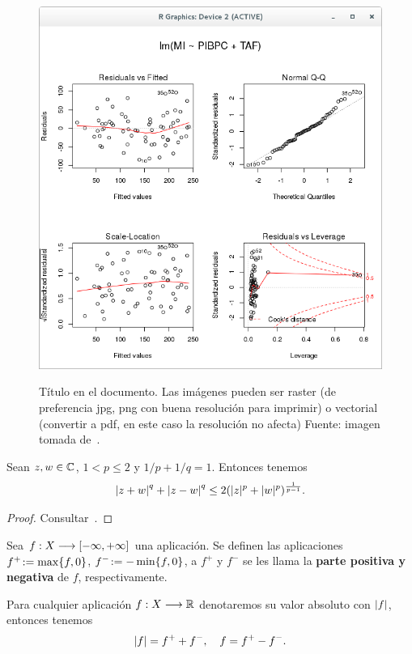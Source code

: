 \begin{figure}[ht]
\centering
\label{fig:analisisGraficoModelo3}
\includegraphics[width=0.9\linewidth]{analisisGraficoModelo3}\\
\caption[Titulo en el índice de figuras (opcional)]{Título en el 
documento. Las imágenes pueden ser raster (de preferencia jpg, png 
con buena resolución para imprimir) o vectorial (convertir a pdf, en 
este caso la resolución no afecta) Fuente: imagen tomada de~\cite{liu}.}
\end{figure}


\begin{lem}\label{lmcp11}Sean $z,w \in \mathbb{C}$, $1 < p \leq 2$ y $1/p +
1/q = 1$. Entonces tenemos \[\left\vert z+w\right\vert^q + \left\vert z-w\right\vert^q \leq 2 (|z|^p
+ |w|^p)^{\frac{1}{p-1}}.\]
\end{lem}

\begin{proof} Consultar~\cite[p. 227]{Hewit}. \end{proof}

\begin{defn}\label{dfcp5}Sea $f:X\longrightarrow [-\infty,+\infty]$ una aplicación. Se definen
las aplicaciones $f^+\!:=\max\{f,0\}$, $f^-\!:=-\min\{f,0\}$, a
$f^+$ y $f^-$ se les llama la \textbf{parte positiva y negativa} de
$f$, respectivamente.
\end{defn}


\begin{prp}\label{prcp2}Para cualquier aplicación $f:X\longrightarrow \mathbb{R}$
denotaremos su valor absoluto con $\left\vert f\right\vert$, entonces tenemos
\[\left\vert f\right\vert=f^++f^-,\quad f=f^+-f^-.\]
\end{prp}



